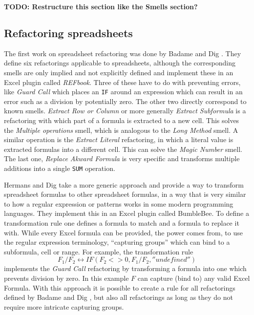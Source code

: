 \documentclass[10pt,conference,compsocconf]{IEEEtran}
\newcommand{\todo}[1]{\textbf{TODO: #1}}
\begin{document}
\todo{Restructure this section like the Smells section?}

\subsection{Refactoring spreadsheets}

The first work on spreadsheet refactoring was done by Badame and Dig \cite{badame2012refactoring}.
They define six refactorings applicable to spreadsheets, although the corresponding smells are only implied and not explicitly defined and implement these in an Excel plugin called \textit{REFbook}.
Three of these have to do with preventing errors, like \textit{Guard Call} which places an \texttt{IF} around an expression which can result in an error such as a division by potentially zero.
The other two directly correspond to known smells.
\textit{Extract Row or Column} or more generally \textit{Extract Subformula} is a refactoring with which part of a formula is extracted to a new cell.
This solves the \textit{Multiple operations} smell, which is analogous to the \textit{Long Method} \cite{Hermans2012intra} smell.
A similar operation is the \textit{Extract Literal} refactoring, in which a literal value is extracted formulas into a different cell.
This can solve the \textit{Magic Number} smell.
The last one, \textit{Replace Akward Formula} is very specific and transforms multiple additions into a single \texttt{SUM} operation.

Hermans and Dig \cite{hermans2014bumblebee} take a more generic approach and provide a way to transform spreadsheet formulas to other spreadsheet formulas, in a way that is very similar to how a regular expression or patterns works in some modern programming languages.
They implement this in an Excel plugin called BumbleBee.
To define a transformation rule one defines a formula to match and a formula to replace it with. While every Excel formula can be provided, the power comes from, to use the regular expression terminology, ``capturing groups'' which can bind to a subformula, cell or range. For example, the transformation rule
\[F_1/F_2 \leftrightarrow IF(F_2<>0,F_1/F_2,''undefined'')\]
 implements the \textit{Guard Call} \cite{badame2012refactoring} refactoring by transforming a formula into one which prevents division by zero.
 In this example $F$ can capture (bind to) any valid Excel Formula.
 With this approach it is possible to create a rule for all refactorings defined by Badame and Dig \cite{badame2012refactoring}, but also all refactorings as long as they do not require more intricate capturing groups.
\end{document}
